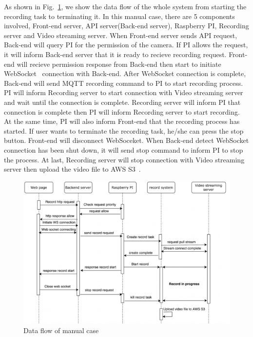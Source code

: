 As shown in Fig.~\ref{fig:manual-sequece-diagram}, we show the data flow of the whole system from starting the recording task to terminating it. In this manual case, there are 5 components involved, Front-end server, API server(Back-end server), Raspberry PI, Recording server and Video streaming server. When Front-end server sends API request, Back-end will query PI for the permission of the camera. If PI allows the request, it will inform Back-end server that it is ready to recieve recording request. Front-end will recieve permission response from Back-end then start to initiate WebSocket~\cite{websocket} connection with Back-end. After WebSocket connection is complete, Back-end will send MQTT recording command to PI to start recording process. PI will inform Recording server to start connection with Video streaming server and wait until the connection is complete. Recording server will inform PI that connection is complete then PI will inform Recording server to start recording. At the same time, PI will also inform Front-end that the recording process has started. If user wants to terminate the recording task, he/she can press the stop button. Front-end will disconnect WebSoceket. When Back-end detect WebSocket connection has been shut down, it will send stop command to inform PI to stop the process. At last, Recording server will stop connection with Video streaming server then upload the video file to AWS S3~\cite{aws-s3}.

\begin{figure}[H]
    \centering
    \includegraphics[width=\textwidth]{figsrc/manual-sequece-diagram.png}
    \caption{Data flow of manual case\label{fig:manual-sequece-diagram}}
\end{figure}

